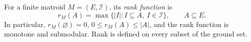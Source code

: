 
For a finite matroid $M=(E,\mathcal I)$, its \emph{rank function} is
\[
r_M(A)=\max\{|I|:I\subseteq A,\ I\in\mathcal I\},\qquad A\subseteq E.
\]
In particular, $r_M(\varnothing)=0$, $0\le r_M(A)\le|A|$, and the rank function is monotone and submodular. Rank is defined on every subset of the ground set.
